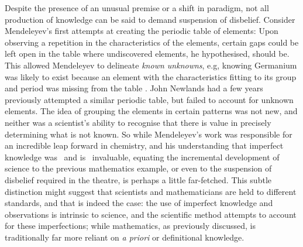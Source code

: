 Despite the presence of an unusual premise or a shift in paradigm, not all production of knowledge can be said to demand suspension of disbelief. Consider Mendeleyev's first attempts at creating the periodic table of elements: Upon observing a repetition in the characteristics of the elements, certain gaps could be left open in the table where undiscovered elements, he hypothesised, should be. This allowed Mendeleyev to delineate \textit{known unknowns}, e.g, knowing Germanium was likely to exist because an element with the characteristics fitting to its group and period was missing from the table \citep[p.101]{ChemIB2014Pearson}. John Newlands had a few years previously attempted a similar periodic table, but failed to account for unknown elements. The idea of grouping the elements in certain patterns was not new, and neither was a scientist's ability to recognise that there is value in precisely determining what is not known. So while Mendeleyev's work was responsible for an incredible leap forward in chemistry, and his understanding that imperfect knowledge was \textendash\ and is \textendash\ invaluable, equating the incremental development of science to the previous mathematics example, or even to the suspension of disbelief required in the theatre, is perhaps a little far-fetched. This subtle distinction might suggest that scientists and mathematicians are held to different standards, and that is indeed the case: the use of imperfect knowledge and observations is intrinsic to science, and the scientific method attempts to account for these imperfections; while mathematics, as previously discussed, is traditionally far more reliant on \emph{a priori} or definitional knowledge. 

